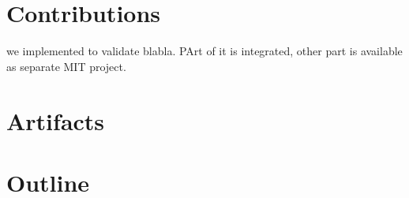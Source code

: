 \documentclass[a4paper,12pt,twoside]{../includes/ThesisStyle}
\begin{document}
\section{Contributions}

we implemented to validate blabla. PArt of it is integrated, other part is available as separate MIT project.

\section{Artifacts}

\section{Outline}



\ifx\wholebook\relax\else
    
\end{document}
